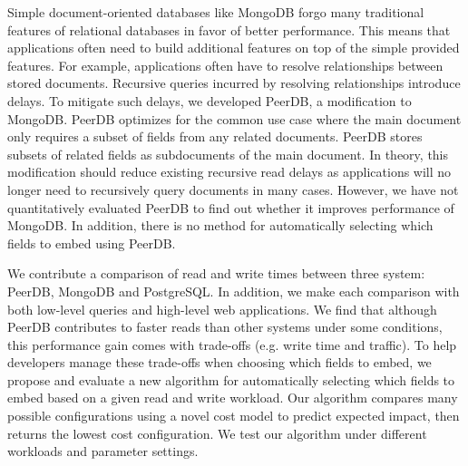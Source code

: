 Simple document-oriented databases like MongoDB forgo many traditional features of relational databases in favor of better performance. 
This means that applications often need to build additional features on top of the simple provided features. 
For example, applications often have to resolve relationships between stored documents. 
Recursive queries incurred by resolving relationships introduce delays. 
To mitigate such delays, we developed PeerDB, a modification to MongoDB. 
PeerDB optimizes for the common use case where the main document only requires a subset of fields from any related documents. 
PeerDB stores subsets of related fields as subdocuments of the main document. 
In theory, this modification should reduce existing recursive read delays as applications will no longer need to recursively query documents in many cases. 
However, we have not quantitatively evaluated PeerDB to find out whether it improves performance of MongoDB. In addition, there is no method for automatically selecting which fields to embed using PeerDB.

We contribute a comparison of read and write times between three system: PeerDB, MongoDB and PostgreSQL. 
In addition, we make each comparison with both low-level queries and high-level web applications. 
We find that although PeerDB contributes to faster reads than other systems under some conditions, this performance gain comes with trade-offs (e.g. write time and traffic). 
To help developers manage these trade-offs when choosing which fields to embed, we propose and evaluate a new algorithm for automatically selecting which fields to embed based on a given read and write workload. 
Our algorithm compares many possible configurations using a novel cost model to predict expected impact, then returns the lowest cost configuration.
We test our algorithm under different workloads and parameter settings.